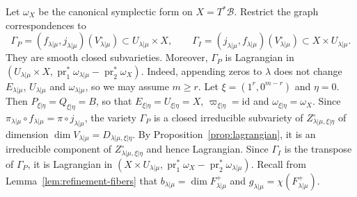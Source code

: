 \documentclass[11pt,a4paper]{amsart}
\theoremstyle{definition}
\theoremstyle{remark}
\newcommand{\B}{\mathcal B}
\newcommand{\pr}{\operatorname{pr}}
\newcommand{\lm}{\lambda|\mu}
\newcommand{\xh}{\xi|\eta}
\numberwithin{equation}{section}
\begin{document}
Let $\omega_X$ be the canonical symplectic form on $X=T^*\B$. Restrict the
graph correspondences to
$$
\Gamma_P=(f_{\lm},j_{\lm})(V^\circ_{\lm})\subset U_{\lm}\times X,\qquad
\Gamma_I=(j_{\lm},f_{\lm})(V^\circ_{\lm})\subset X\times U_{\lm}.
$$
They are smooth closed subvarieties. Moreover, $\Gamma_P$ is Lagrangian in
$(U_{\lm}\times X,\pr_1^*\omega_{\lm}-\pr_2^*\omega_X)$. Indeed, appending
zeros to $\lambda$ does not change $E_{\lm}$, $U_{\lm}$ and $\omega_{\lm}$, so
we may assume $m\ge r$. Let $\xi=(1^r,0^{m-r})$ and $\eta=0$. Then
$P_{\xh}=Q_{\xh}=B$, so that $E_{\xh}=U_{\xh}=X$, $\varpi_{\xh}=\mathrm{id}$
and $\omega_{\xh}=\omega_X$. Since $\pi_{\lm}\circ f_{\lm}=\pi\circ j_{\lm}$,
the variety $\Gamma_P$ is a closed irreducible subvariety of
$Z^\circ_{\lm,\xh}$ of dimension $\dim V_{\lm}=D_{\lm,\xh}$. By
Proposition~\ref{prop:lagrangian}, it is an irreducible component of
$Z^\circ_{\lm,\xh}$ and hence Lagrangian. Since $\Gamma_I$ is the transpose
of $\Gamma_P$, it is Lagrangian in
$(X\times U_{\lm},\pr_1^*\omega_X-\pr_2^*\omega_{\lm})$.
Recall from Lemma~\ref{lem:refinement-fibers} that
$b_{\lm}=\dim F^+_{\lm}$ and $g_{\lm}=\chi(F^+_{\lm})$.
\end{document}
